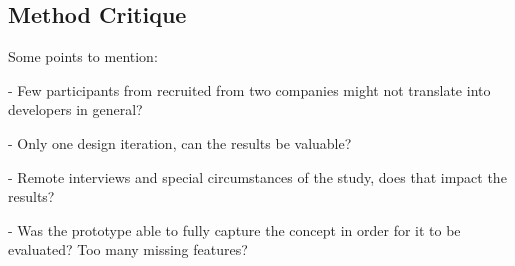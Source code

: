\subsection{Method Critique}
Some points to mention:

- Few participants from recruited from two companies might not translate into developers in general?

- Only one design iteration, can the results be valuable?

- Remote interviews and special circumstances of the study, does that impact the results?

- Was the prototype able to fully capture the concept in order for it to be evaluated? Too many missing features?